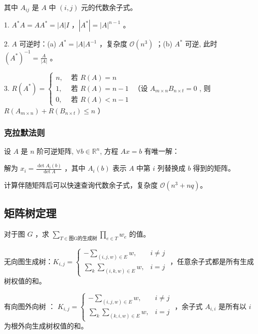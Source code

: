 \begin{center}
其中 $A_{i j}$ 是 $A$ 中 $(i, j)$ 元的代数余子式。
\end{center}

1. $A^* A=A A^*=|A|I$ ，$|A^*| =|A|^{n-1}$ 。 

2. $A$ 可逆时：(a) $A^*=|A|A^{-1}$ ，复杂度 $\mathcal{O}(n^3)$ ；(b) $A^*$ 可逆, 此时 $\left(A^*\right)^{-1}=\displaystyle \frac{A}{|A|}$ 。

3. $
R\left(A^*\right)=\left\{\begin{array}{ll}
n, & \text { 若 } R(A)=n \\
1, & \text { 若 } R(A)=n-1 \\
0, & \text { 若 } R(A)<n-1
\end{array}\right.
$ （设 $A_{m \times n} B_{n \times t}=0$ , 则  $R\left(A_{m \times n}\right)+R\left(B_{n \times t}\right) \leq n$ ）

\subsubsection*{克拉默法则}

设 $A$ 是 $n$ 阶可逆矩阵, $\forall b \in \mathbb{R}^n$, 方程 $A x=b$ 有唯一解：

\vspace{0.2cm}

解为 $x_i=\displaystyle \frac{\operatorname{det} A_i(b)}{\operatorname{det} A}$ ，其中 $A_i(b)$ 表示 $A$ 中第 $i$ 列替换成 $b$ 得到的矩阵。

\vspace{0.2cm}

计算伴随矩阵后可以快速查询代数余子式，复杂度 $\mathcal{O}(n^3 + nq)$。

\subsection{矩阵树定理}

对于图 $G$ ，求 $\sum_{T\in \text{图G的生成树}} \prod_{e\in T} w_e$ 的值。



无向图生成树：$K_{i, j}= \begin{cases}-\sum_{(i, j, w) \in E} w, & i \neq j \\ \sum_k \sum_{(i, k, w) \in E} w, & i=j\end{cases}$ ，任意余子式都是所有生成树权值的和。
 
有向图外向树 ： $K_{i, j}= \begin{cases}-\sum_{(i, j, w) \in E} w, & i \neq j \\ \sum_k \sum_{(k, i, w) \in E} w, & i=j\end{cases}$ ，余子式 $A_{i,i}$ 是所有以 $i$ 为根外向生成树权值的和。

